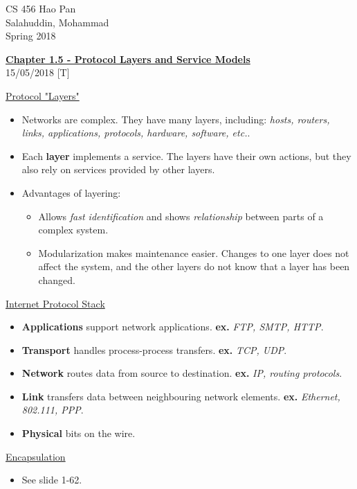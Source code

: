 \documentclass{article}
\begin{document}
\noindent
{CS 456 \hfill Hao Pan}\\
{Salahuddin, Mohammad}\\
{Spring 2018}


\begin{center}
\underline{\large \bf Chapter 1.5 - Protocol Layers and Service Models}\\
\noindent
{\hfill 15/05/2018 [T]}
\end{center}

\underline{Protocol "Layers"}

\begin{itemize}
\item Networks are complex. They have many layers, including: {\it hosts, routers, links, applications, protocols, hardware, software, etc.}.
\item Each {\bf layer} implements a service. The layers have their own actions, but they also rely on services provided by other layers.
\item Advantages of layering:
\begin{itemize}
\item Allows {\it fast identification} and shows {\it relationship} between parts of a complex system.
\item Modularization makes maintenance easier. Changes to one layer does not affect the system, and the other layers do not know that a layer has been changed.
\end{itemize}
\end{itemize}

\underline{Internet Protocol Stack}

\begin{itemize}
\item {\bf Applications} support network applications. {\bf ex.} {\it FTP, SMTP, HTTP}.
\item {\bf Transport} handles process-process transfers. {\bf ex.} {\it TCP, UDP}.
\item {\bf Network} routes data from source to destination. {\bf ex.} {\it IP, routing protocols}.
\item {\bf Link} transfers data between neighbouring network elements. {\bf ex.} {\it Ethernet, 802.111, PPP}.
\item {\bf Physical} bits on the wire.
\end{itemize}

\underline{Encapsulation}

\begin{itemize}
\item See slide 1-62.
\end{itemize}
\end{document}
